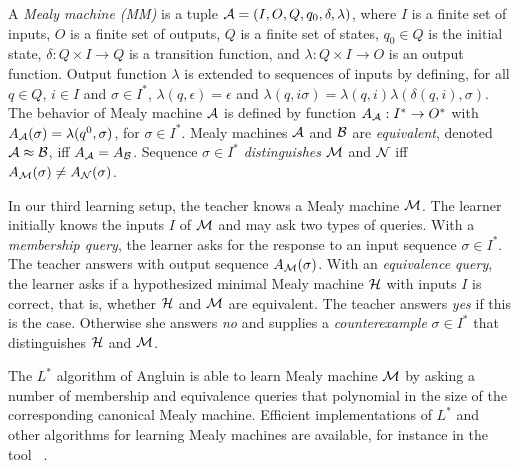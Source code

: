 A \emph{Mealy machine (MM)} is a tuple ${\mathcal A} = (I, O, Q, q_0, \delta, \lambda)$, where
$I$ is a finite set of inputs,
$O$ is a finite set of outputs,
$Q$ is a finite set of states,
$q_0 \in Q$ is the initial state,
$\delta: Q \times I \rightarrow Q$ is a transition function, and
$\lambda: Q \times I \rightarrow O$ is an output function.
%
Output function $\lambda$ is extended to sequences of inputs by defining,
for all $q \in Q$, $i \in I$ and $\sigma \in I^{\ast}$,
$\lambda(q, \epsilon) = \epsilon$ and $\lambda(q, i \sigma) = \lambda(q, i) \lambda(\delta(q, i), \sigma)$.
%
The behavior of Mealy machine ${\mathcal A}$ is defined by function $A_{\mathcal A} : I^{\ast} \rightarrow O^{\ast}$ with
$A_{\mathcal A}(\sigma) = \lambda (q^0, \sigma)$, for  $\sigma \in I^{\ast}$.
Mealy machines ${\mathcal A}$ and ${\mathcal B}$ are \emph{equivalent}, denoted ${\mathcal A} \approx {\mathcal B}$, iff $A_{{\mathcal A}} = A_{{\mathcal B}}$.
Sequence $\sigma \in I^{\ast}$ \emph{distinguishes}
${\mathcal M}$ and ${\mathcal N}$ iff $A_{{\mathcal M}}(\sigma) \neq A_{{\mathcal N}}(\sigma)$.

In our third learning setup, the teacher knows a Mealy machine ${\mathcal M}$. 
The learner initially knows the inputs $I$ of ${\mathcal M}$ and may ask two types of queries.
With a \emph{membership query}, the learner asks for the response to an input sequence $\sigma \in I^{\ast}$.
The teacher answers with output sequence $A_{{\mathcal M}}(\sigma)$.
With an \emph{equivalence query}, the learner asks if a hypothesized minimal Mealy machine ${\mathcal H}$ with
inputs $I$ is correct, that is, whether ${\mathcal H}$ and ${\mathcal M}$ are equivalent.
The teacher answers \emph{yes} if this is the case. Otherwise she answers \emph{no} and supplies a
\emph{counterexample} $\sigma \in I^{\ast}$ that distinguishes ${\mathcal H}$ and ${\mathcal M}$.

The $L^{\ast}$ algorithm of Angluin \cite{Ang87} is able to learn Mealy machine ${\mathcal M}$ by asking a
number of membership and equivalence queries that polynomial in the size of the corresponding canonical Mealy machine.
Efficient implementations of $L^{\ast}$ and other algorithms for learning Mealy machines are available,
for instance in the tool \learnlib\ \cite{Nie03,RSBM09,MertenSHM11}.




